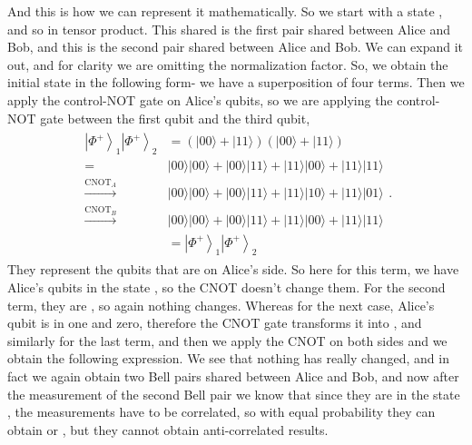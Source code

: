 And this is how we can represent it mathematically. So we start with a state \ket{\Psi^+}, and \ket{\Psi^+} so in tensor product. This \ket{\Psi^+} shared is the first pair shared between Alice and Bob, and this is the second pair shared between Alice and Bob. We can expand it out, and for clarity we are omitting the normalization factor. So, we obtain the initial state in the following form- we have a superposition of four terms. Then we apply the control-NOT gate on Alice's qubits, so we are applying the control-NOT gate between the first qubit and the third qubit,
\begin{align}
    \begin{aligned}
\left|\Phi^{+}\right\rangle_{1}\left|\Phi^{+}\right\rangle_{2} &=(|00\rangle+|11\rangle)(|00\rangle+|11\rangle) \\
=&|00\rangle|00\rangle+|00\rangle|11\rangle+|11\rangle|00\rangle+|11\rangle|11\rangle \\
\stackrel{\mathrm{CNOT}_{A}}{\longrightarrow} &|00\rangle|00\rangle+|00\rangle|11\rangle+|11\rangle|10\rangle+|11\rangle|01\rangle \\
\stackrel{\mathrm{CNOT}_{B}}{\longrightarrow} &|00\rangle|00\rangle+|00\rangle|11\rangle+|11\rangle|00\rangle+|11\rangle|11\rangle \\
&=\left|\Phi^{+}\right\rangle_{1}\left|\Phi^{+}\right\rangle_{2}
\end{aligned}.
\end{align}
They represent the qubits that are on Alice's side. So here for this term, we have Alice's qubits in the state , so the CNOT doesn't change them. For the second term, they are , so again nothing changes. Whereas for the next case, Alice's qubit is in one and zero, therefore the CNOT gate transforms it into , and similarly for the last term, and then we apply the CNOT on both sides and we obtain the following expression. We see that nothing has really changed, and in fact we again obtain two Bell pairs shared between Alice and Bob, and now after the measurement of the second Bell pair we know that since they are in the state  \ket{\Phi^+}, the measurements have to be correlated, so with equal probability they can obtain  or , but they cannot obtain anti-correlated results.

